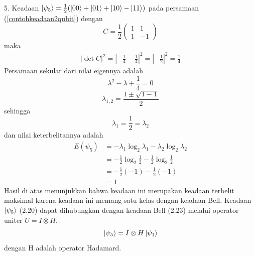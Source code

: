 5. Keadaan $\ket{\psi_5}=\frac{1}{2}(\ket{00}+\ket{01}+\ket{10}-\ket{11})$ pada persamaan (\ref{contohkeadaan2qubit}) dengan
\begin{equation}
	C=\frac{1}{2}
	\begin{pmatrix}
		1&1\\
		1&-1
	\end{pmatrix}
\end{equation}
maka
\begin{equation}
	\begin{aligned}
		|\det C|^2=|-\frac{1}{4}-\frac{1}{4}|^2=|-\frac{1}{2}|^2=\frac{1}{4}
	\end{aligned}
\end{equation}
Persamaan sekular dari nilai eigennya adalah
\begin{equation}
	\lambda^2-\lambda+\frac{1}{4}=0
\end{equation}
\begin{equation}
	\lambda_{1,2}=\frac{1\pm\sqrt{1-1}}{2}
\end{equation}
sehingga
\begin{equation}
	\lambda_1=\frac{1}{2}=\lambda_2
\end{equation}
dan nilai keterbelitannya adalah
\begin{equation}
	\begin{aligned}
		E(\psi_5)
		&=-\lambda_1\log_2\lambda_1-\lambda_2\log_2\lambda_2\\
		&=-\frac{1}{2}\log_2\frac{1}{2}-\frac{1}{2}\log_2\frac{1}{2}\\
		&=-\frac{1}{2}(-1)-\frac{1}{2}(-1)\\
		&=1
	\end{aligned}
\end{equation}
Hasil di atas menunjukkan bahwa keadaan ini merupakan keadaan terbelit maksimal karena keadaan ini memang satu kelas dengan keadaan Bell. Keadaan $\ket{\psi_5}$ (2.20) dapat dihubungkan dengan keadaan Bell (2.23) melalui operator uniter $U=I\otimes H$.
\begin{equation}
	\ket{\psi_5}=I\otimes H\ket{\psi_1}
\end{equation}
dengan H adalah operator Hadamard.

